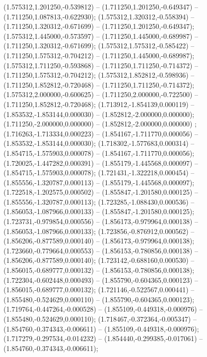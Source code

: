  (1.575312,1.201250,-0.539812) -- (1.711250,1.201250,-0.649347) -- (1.711250,1.087813,-0.622930);
 (1.575312,1.320312,-0.558394) -- (1.711250,1.320312,-0.671699) -- (1.711250,1.201250,-0.649347);
 (1.575312,1.445000,-0.573597) -- (1.711250,1.445000,-0.689987) -- (1.711250,1.320312,-0.671699);
 (1.575312,1.575312,-0.585422) -- (1.711250,1.575312,-0.704212) -- (1.711250,1.445000,-0.689987);
 (1.575312,1.711250,-0.593868) -- (1.711250,1.711250,-0.714372) -- (1.711250,1.575312,-0.704212);
 (1.575312,1.852812,-0.598936) -- (1.711250,1.852812,-0.720468) -- (1.711250,1.711250,-0.714372);
 (1.575312,2.000000,-0.600625) -- (1.711250,2.000000,-0.722500) -- (1.711250,1.852812,-0.720468);
 (1.713912,-1.854139,0.000119) -- (1.853532,-1.853144,0.000030) -- (1.852812,-2.000000,0.000000);
 (1.711250,-2.000000,0.000000) -- (1.852812,-2.000000,0.000000) ;
 (1.716263,-1.713334,0.000223) -- (1.854167,-1.711770,0.000056) -- (1.853532,-1.853144,0.000030);
 (1.718302,-1.577683,0.000314) -- (1.854715,-1.575903,0.000078) -- (1.854167,-1.711770,0.000056);
 (1.720025,-1.447282,0.000391) -- (1.855179,-1.445568,0.000097) -- (1.854715,-1.575903,0.000078);
 (1.721431,-1.322218,0.000454) -- (1.855556,-1.320787,0.000113) -- (1.855179,-1.445568,0.000097);
 (1.722518,-1.202575,0.000502) -- (1.855847,-1.201580,0.000125) -- (1.855556,-1.320787,0.000113);
 (1.723285,-1.088430,0.000536) -- (1.856053,-1.087966,0.000133) -- (1.855847,-1.201580,0.000125);
 (1.723731,-0.979854,0.000556) -- (1.856173,-0.979964,0.000138) -- (1.856053,-1.087966,0.000133);
 (1.723856,-0.876912,0.000562) -- (1.856206,-0.877589,0.000140) -- (1.856173,-0.979964,0.000138);
 (1.723660,-0.779664,0.000553) -- (1.856153,-0.780856,0.000138) -- (1.856206,-0.877589,0.000140);
 (1.723142,-0.688160,0.000530) -- (1.856015,-0.689777,0.000132) -- (1.856153,-0.780856,0.000138);
 (1.722304,-0.602448,0.000493) -- (1.855790,-0.604365,0.000123) -- (1.856015,-0.689777,0.000132);
 (1.721146,-0.522567,0.000441) -- (1.855480,-0.524629,0.000110) -- (1.855790,-0.604365,0.000123);
 (1.719764,-0.447264,-0.000528) -- (1.855109,-0.449318,-0.000976) -- (1.855480,-0.524629,0.000110);
 (1.718467,-0.372364,-0.005347) -- (1.854760,-0.374343,-0.006611) -- (1.855109,-0.449318,-0.000976);
 (1.717279,-0.297534,-0.014232) -- (1.854440,-0.299385,-0.017061) -- (1.854760,-0.374343,-0.006611);

